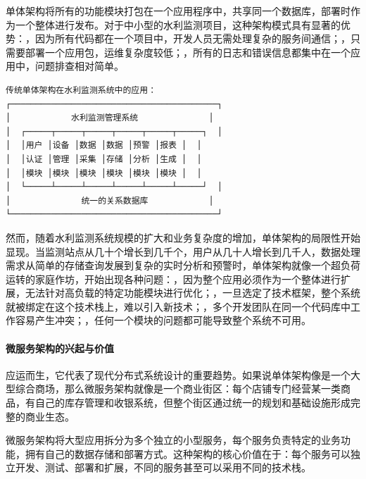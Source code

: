 单体架构将所有的功能模块打包在一个应用程序中，共享同一个数据库，部署时作为一个整体进行发布。对于中小型的水利监测项目，这种架构模式具有显著的优势：，因为所有代码都在一个项目中，开发人员无需处理复杂的服务间通信；，只需要部署一个应用包，运维复杂度较低；，所有的日志和错误信息都集中在一个应用中，问题排查相对简单。

\begin{lstlisting}
传统单体架构在水利监测系统中的应用：
┌─────────────────────────────────────────┐
│            水利监测管理系统              │
│  ┌─────┬─────┬─────┬─────┬─────┬─────┐  │
│  │用户 │设备 │数据 │数据 │预警 │报表 │  │
│  │认证 │管理 │采集 │存储 │分析 │生成 │  │
│  │模块 │模块 │模块 │模块 │模块 │模块 │  │
│  └─────┴─────┴─────┴─────┴─────┴─────┘  │
│              统一的关系数据库            │
└─────────────────────────────────────────┘
\end{lstlisting}

然而，随着水利监测系统规模的扩大和业务复杂度的增加，单体架构的局限性开始显现。当监测站点从几十个增长到几千个，用户从几十人增长到几千人，数据处理需求从简单的存储查询发展到复杂的实时分析和预警时，单体架构就像一个超负荷运转的家庭作坊，开始出现各种问题：，因为整个应用必须作为一个整体进行扩展，无法针对高负载的特定功能模块进行优化；，一旦选定了技术框架，整个系统就被绑定在这个技术栈上，难以引入新技术；，多个开发团队在同一个代码库中工作容易产生冲突；，任何一个模块的问题都可能导致整个系统不可用。

\hypertarget{ux5faeux670dux52a1ux67b6ux6784ux7684ux5174ux8d77ux4e0eux4ef7ux503c}{%
\paragraph{微服务架构的兴起与价值}\label{ux5faeux670dux52a1ux67b6ux6784ux7684ux5174ux8d77ux4e0eux4ef7ux503c}}

应运而生，它代表了现代分布式系统设计的重要趋势。如果说单体架构像是一个大型综合商场，那么微服务架构就像是一个商业街区：每个店铺专门经营某一类商品，有自己的库存管理和收银系统，但整个街区通过统一的规划和基础设施形成完整的商业生态。

微服务架构将大型应用拆分为多个独立的小型服务，每个服务负责特定的业务功能，拥有自己的数据存储和部署方式。这种架构的核心价值在于：每个服务可以独立开发、测试、部署和扩展，不同的服务甚至可以采用不同的技术栈。


